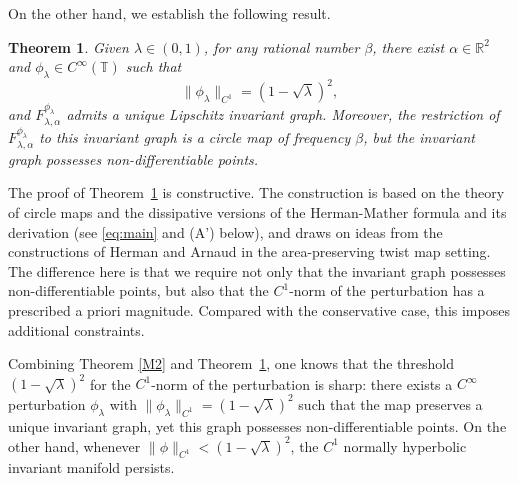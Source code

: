 \documentclass{amsart}
\newtheorem{Theorem}{Theorem}
\begin{document}
	On the other hand, we establish the following result.
	
	\vspace{1ex}
	
	\begin{Theorem}\label{Th1}
		Given \(\lambda \in (0,1)\), for any rational number \(\beta\), there exist \(\alpha \in \mathbb{R}^2\) and \(\phi_\lambda \in C^\infty(\mathbb{T})\) such that
		\[
		\|\phi_{\lambda}\|_{C^1} = (1-\sqrt{\lambda})^2,
		\]
		and \(F_{\lambda,\alpha}^{\phi_{\lambda}}\) admits a unique Lipschitz invariant graph. Moreover, the restriction of \(F_{\lambda,\alpha}^{\phi_{\lambda}}\) to this invariant graph is a circle map of frequency \(\beta\), but the invariant graph possesses non-differentiable points.
	\end{Theorem}
	The proof of Theorem~\ref{Th1} is constructive. The construction is based on the theory of circle maps \cite{H79} and the dissipative versions of the Herman-Mather formula and its derivation (see \eqref{eq:main} and (A') below), and draws on ideas from the constructions of Herman \cite{H83} and Arnaud \cite{Ar11} in the area-preserving twist map setting. The difference here is that we require not only that the invariant graph possesses non-differentiable points, but also that the \(C^1\)-norm of the perturbation has a prescribed a priori magnitude. Compared with the conservative case, this imposes additional constraints.
	
	Combining Theorem \ref{M2} and Theorem~\ref{Th1}, one knows that the threshold \((1-\sqrt{\lambda})^2\) for the \(C^1\)-norm of the perturbation is sharp: there exists a \(C^\infty\) perturbation \(\phi_{\lambda}\) with \(\|\phi_{\lambda}\|_{C^1} = (1-\sqrt{\lambda})^2\) such that the map preserves a unique invariant graph, yet this graph possesses non-differentiable points. On the other hand, whenever \(\|\phi\|_{C^1} < (1-\sqrt{\lambda})^2\), the \(C^1\) normally hyperbolic invariant manifold persists.
	
\end{document}
